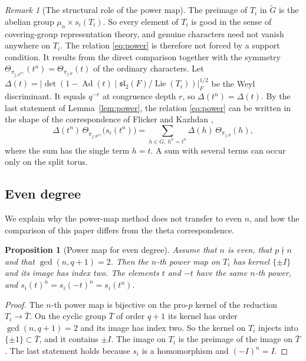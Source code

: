 \documentclass[12pt,letterpaper]{article}
\numberwithin{equation}{section}
\newtheorem{proposition}[theorem]{Proposition}
\theoremstyle{definition}
\theoremstyle{remark}
\newtheorem{remark}[theorem]{Remark}
\newcommand{\Gt}{\widetilde G}
\newcommand{\Ad}{\operatorname{Ad}}
\newcommand{\Lie}{\operatorname{Lie}}
\begin{document}
\begin{remark}[The structural role of the power map]\label{rem:structural}
The preimage of $T_i$ in $\Gt$ is the abelian group $\mu_n\times s_i(T_i)$. So every element of $T_i$ is good in the sense of covering-group representation theory, and genuine characters need not vanish anywhere on $T_i$. The relation \eqref{eq:power} is therefore not forced by a support condition. It results from the direct comparison together with the symmetry $\Theta_{\pi_{j,\theta^{\langle n\rangle}}}(t^n)=\Theta_{\pi_{j,\theta}}(t)$ of the ordinary characters. Let $\Delta(t)=\bigl|\det(1-\Ad(t)\mid\mathfrak{sl}_2(F)/\Lie(T_i))\bigr|_F^{1/2}$ be the Weyl discriminant. It equals $q^{-r}$ at congruence depth $r$, so $\Delta(t^n)=\Delta(t)$. By the last statement of Lemma~\ref{lem:power}, the relation \eqref{eq:power} can be written in the shape of the correspondence of Flicker and Kazhdan \cite{FK86},
\[
 \Delta(t^n)\,\Theta_{\widetilde\pi_{j,\theta^{\langle n\rangle}}}\bigl(s_i(t^n)\bigr)
 =\sum_{h\in G,\ h^n=t^n}\Delta(h)\,\Theta_{\pi_{j,\theta}}(h),
\]
where the sum has the single term $h=t$. A sum with several terms can occur only on the split torus.
\end{remark}

\subsection*{Even degree}
We explain why the power-map method does not transfer to even $n$, and how the comparison of this paper differs from the theta correspondence.

\begin{proposition}[Power map for even degree]\label{prop:even}
Assume that $n$ is even, that $p\nmid n$ and that $\gcd(n,q+1)=2$. Then the $n$-th power map on $T_i$ has kernel $\{\pm I\}$ and its image has index two. The elements $t$ and $-t$ have the same $n$-th power, and $s_i(t)^n=s_i(-t)^n=s_i(t^n)$.
\end{proposition}
\begin{proof}
The $n$-th power map is bijective on the pro-$p$ kernel of the reduction $T_i\to\bar T$. On the cyclic group $\bar T$ of order $q+1$ its kernel has order $\gcd(n,q+1)=2$ and its image has index two. So the kernel on $T_i$ injects into $\{\pm1\}\subset\bar T$, and it contains $\pm I$. The image on $T_i$ is the preimage of the image on $\bar T$. The last statement holds because $s_i$ is a homomorphism and $(-I)^n=I$.
\end{proof}
\end{document}
